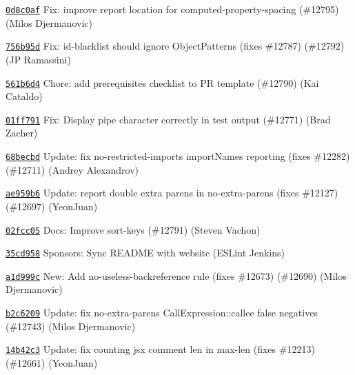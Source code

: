 \begin{DoxyItemize}
\item \href{https://github.com/eslint/eslint/commit/0d8c0affe1ae7ecf228cdf91b490921f7e9d1fdb}{\texttt{ {\ttfamily 0d8c0af}}} Fix\+: improve report location for computed-\/property-\/spacing (\#12795) (Milos Djermanovic)
\item \href{https://github.com/eslint/eslint/commit/756b95d59fb97cd9b3f3adf98cebf529fe4842a2}{\texttt{ {\ttfamily 756b95d}}} Fix\+: id-\/blacklist should ignore Object\+Patterns (fixes \#12787) (\#12792) (JP Ramassini)
\item \href{https://github.com/eslint/eslint/commit/561b6d4726f3e77dd40ba0d340ca7f08429cd2eb}{\texttt{ {\ttfamily 561b6d4}}} Chore\+: add prerequisites checklist to PR template (\#12790) (Kai Cataldo)
\item \href{https://github.com/eslint/eslint/commit/01ff7910af86fc45b76e883bc9ab00c9be3b50ac}{\texttt{ {\ttfamily 01ff791}}} Fix\+: Display pipe character correctly in test output (\#12771) (Brad Zacher)
\item \href{https://github.com/eslint/eslint/commit/68becbd84e8a0693409d36f2be10679c483e233a}{\texttt{ {\ttfamily 68becbd}}} Update\+: fix no-\/restricted-\/imports import\+Names reporting (fixes \#12282) (\#12711) (Andrey Alexandrov)
\item \href{https://github.com/eslint/eslint/commit/ae959b691fb148ac8b474c924c8cb01ef61c436d}{\texttt{ {\ttfamily ae959b6}}} Update\+: report double extra parens in no-\/extra-\/parens (fixes \#12127) (\#12697) (Yeon\+Juan)
\item \href{https://github.com/eslint/eslint/commit/02fcc055710e8d69d986f1e682cae2014ad881e2}{\texttt{ {\ttfamily 02fcc05}}} Docs\+: Improve sort-\/keys (\#12791) (Steven Vachon)
\item \href{https://github.com/eslint/eslint/commit/35cd95893be0afd8c954cbcf9268c2aa045b7d5b}{\texttt{ {\ttfamily 35cd958}}} Sponsors\+: Sync README with website (ESLint Jenkins)
\item \href{https://github.com/eslint/eslint/commit/a1d999c6b4e51c317ad409110be7be214ff9f7c6}{\texttt{ {\ttfamily a1d999c}}} New\+: Add no-\/useless-\/backreference rule (fixes \#12673) (\#12690) (Milos Djermanovic)
\item \href{https://github.com/eslint/eslint/commit/b2c62096a8b318765d618cab222240f87d73063b}{\texttt{ {\ttfamily b2c6209}}} Update\+: fix no-\/extra-\/parens Call\+Expression\+::callee false negatives (\#12743) (Milos Djermanovic)
\item \href{https://github.com/eslint/eslint/commit/14b42c386be3387c415267b789f277e1294d4567}{\texttt{ {\ttfamily 14b42c3}}} Update\+: fix counting jsx comment len in max-\/len (fixes \#12213) (\#12661) (Yeon\+Juan)

\end{DoxyItemize}
